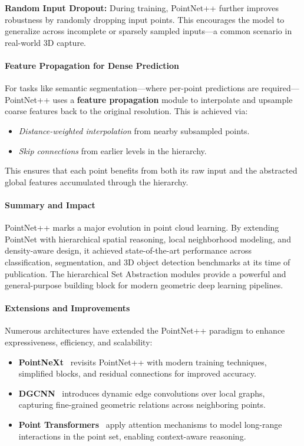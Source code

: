 \noindent
\textbf{Random Input Dropout:} 
During training, PointNet++ further improves robustness by randomly dropping input points. This encourages the model to generalize across incomplete or sparsely sampled inputs—a common scenario in real-world 3D capture.

\paragraph{Feature Propagation for Dense Prediction}
For tasks like semantic segmentation—where per-point predictions are required—PointNet++ uses a \textbf{feature propagation} module to interpolate and upsample coarse features back to the original resolution. This is achieved via:
\begin{itemize}
    \item \emph{Distance-weighted interpolation} from nearby subsampled points.
    \item \emph{Skip connections} from earlier levels in the hierarchy.
\end{itemize}
This ensures that each point benefits from both its raw input and the abstracted global features accumulated through the hierarchy.

\paragraph{Summary and Impact}
PointNet++ marks a major evolution in point cloud learning. By extending PointNet with hierarchical spatial reasoning, local neighborhood modeling, and density-aware design, it achieved state-of-the-art performance across classification, segmentation, and 3D object detection benchmarks at its time of publication. The hierarchical Set Abstraction modules provide a powerful and general-purpose building block for modern geometric deep learning pipelines.

\paragraph{Extensions and Improvements}
Numerous architectures have extended the PointNet++ paradigm to enhance expressiveness, efficiency, and scalability:

\begin{itemize}
    \item \textbf{PointNeXt}~\cite{qian2022_pointnext} revisits PointNet++ with modern training techniques, simplified blocks, and residual connections for improved accuracy.
    \item \textbf{DGCNN}~\cite{wang2019_dgcnn} introduces dynamic edge convolutions over local graphs, capturing fine-grained geometric relations across neighboring points.
    \item \textbf{Point Transformers}~\cite{zhao2021_point, wu2022_point} apply attention mechanisms to model long-range interactions in the point set, enabling context-aware reasoning.
\end{itemize}

